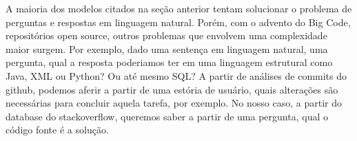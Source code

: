 A maioria dos modelos citados na seção anterior tentam solucionar o problema de perguntas e respostas em linguagem natural. Porém, com o advento do Big Code, repositórios open source, outros problemas que envolvem uma complexidade maior surgem. Por exemplo, dado uma sentença em linguagem natural, uma pergunta, qual a resposta poderiamos ter em uma linguagem estrutural como Java, XML ou Python? Ou até mesmo SQL? A partir de análises de commits do github, podemos aferir a partir de uma estória de usuário, quais alterações são necessárias para concluir aquela tarefa, por exemplo. No nosso caso, a partir do database do stackoverflow, queremos saber a partir de uma pergunta, qual o código fonte é a solução.
